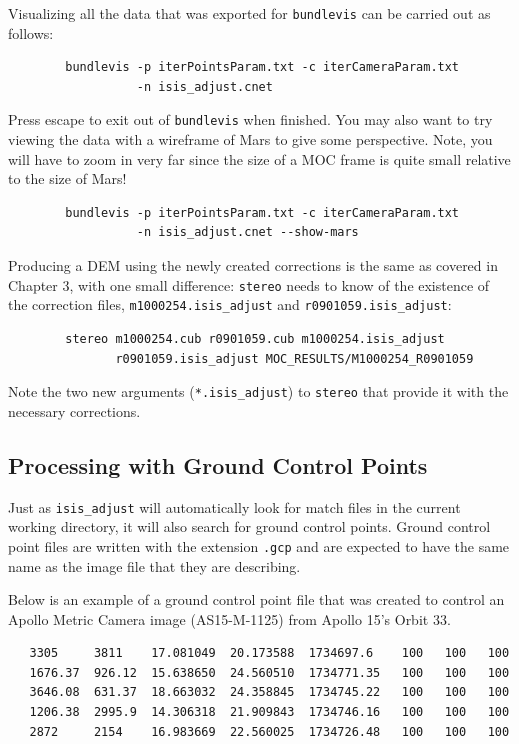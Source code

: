 Visualizing all the data that was exported for \texttt{bundlevis} can
be carried out as follows:

\begin{verbatim}
        bundlevis -p iterPointsParam.txt -c iterCameraParam.txt 
                  -n isis_adjust.cnet
\end{verbatim}

Press escape to exit out of \texttt{bundlevis} when finished.  You may
also want to try viewing the data with a wireframe of Mars to give
some perspective. Note, you will have to zoom in very far since the
size of a MOC frame is quite small relative to the size of Mars!

\begin{verbatim}
        bundlevis -p iterPointsParam.txt -c iterCameraParam.txt
                  -n isis_adjust.cnet --show-mars
\end{verbatim}

Producing a DEM using the newly created corrections is the same as
covered in Chapter 3, with one small difference: \texttt{stereo} needs
to know of the existence of the correction files,
\texttt{m1000254.isis\_adjust} and \texttt{r0901059.isis\_adjust}:

\begin{verbatim}
        stereo m1000254.cub r0901059.cub m1000254.isis_adjust
               r0901059.isis_adjust MOC_RESULTS/M1000254_R0901059
\end{verbatim}

Note the two new arguments (\texttt{*.isis\_adjust}) to \texttt{stereo}
that provide it with the necessary corrections.

\subsection{Processing with Ground Control Points}

Just as \texttt{isis\_adjust} will automatically look for match files
in the current working directory, it will also search for ground
control points. Ground control point files are written with the
extension \texttt{.gcp} and are expected to have the same name as the
image file that they are describing.

Below is an example of a ground control point file that was created to
control an Apollo Metric Camera image (AS15-M-1125) from Apollo 15's
Orbit 33.

\begin{verbatim}
   3305     3811    17.081049  20.173588  1734697.6    100   100   100
   1676.37  926.12  15.638650  24.560510  1734771.35   100   100   100
   3646.08  631.37  18.663032  24.358845  1734745.22   100   100   100
   1206.38  2995.9  14.306318  21.909843  1734746.16   100   100   100
   2872     2154    16.983669  22.560025  1734726.48   100   100   100
\end{verbatim}


